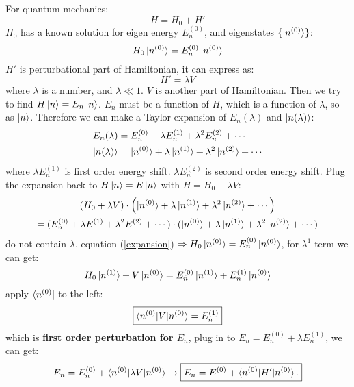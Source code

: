 \documentclass[UTF8,12pt]{article} %
\begin{document}
For quantum mechanics:
\begin{equation}
    H=H_{0} + H'
\end{equation}
$H_0$ has a known solution for eigen energy $E^{(0)}_{n}$, and eigenstates $\{\ket{n^{(0)}}\}$:
\begin{equation}
    H_0\ket{n^{(0)}}=E^{(0)}_n\ket{n^{(0)}}
\end{equation}
$H'$ is perturbational part of Hamiltonian, it can express as:
\begin{equation}
    H'=\lambda V
\end{equation}
where $\lambda$ is a number, and $\lambda\ll1$. $V$ is another part of Hamiltonian. Then we try to find $H\ket{n} = E_{n}\ket{n}$. $E_{n}$ must be a function of $H$, which is a function of $\lambda$, so as $\ket{n}$. Therefore we can make a Taylor expansion of $E_{n}(\lambda)$ and $\ket{n(\lambda)}$:
\begin{align}
E_n(\lambda) &= E_n^{(0)}+\lambda E^{(1)}_n+\lambda^2 E^{(2)}_n+\cdots \\ 
\ket{n(\lambda)} &= \ket{n^{(0)}}+\lambda \ket{n^{(1)}}+\lambda^2 \ket{n^{(2)}}+\cdots
\end{align}
where $\lambda E^{(1)}_{n}$ is first order energy shift. $\lambda E^{(2)}_n$ is second order energy shift. Plug the expansion back to $H\ket{n}=E\ket{n}$ with $H=H_0+\lambda V$:
\begin{multline}
(H_0+\lambda V) \cdot \left(\ket{n^{(0)}}+\lambda \ket{n^{(1)}}+\lambda^2\ket{n^{(2)}}+\cdots\right) \\
= (E^{(0)}_n+\lambda E^{(1)}+\lambda^2E^{(2)}+\cdots)\cdot (\ket{n^{(0)}}+\lambda \ket{n^{(1)}}+\lambda^2\ket{n^{(2)}}+\cdots)
\label{expansion}
\end{multline}
do not contain $\lambda$, equation (\ref{expansion}) $\Rightarrow H_0\ket{n^{(0)}}=E^{(0)}_n\ket{n^{(0)}}$, for $\lambda^{1}$ term we can get:
\begin{equation}
H_{0} \ket{n^{(1)}}+V\ket{n^{(0)}}=E^{(0)}_n\ket{n^{(1)}}+E^{(1)}_n\ket{n^{(0)}}
\label{order1}
\end{equation}
apply $\bra{n^{(0)}}$ to the left:
\begin{equation}
\boxed{ \braket{n^{(0)}|V|n^{(0)}} = E^{(1)}_{n}}  
\label{e1}
\end{equation}
which is \textbf{first order perturbation for $E_{n}$}, plug in to $E_{n} = E^{(0)}_{n} + \lambda E^{(1)}_{n}$, we can get:
\begin{equation}
    \begin{aligned}
        E_n= E^{(0)}_n+ \braket{n^{(0)}|\lambda V|n^{(0)}} \to \boxed {E_n=E^{(0)}+\braket{n^{(0)}|H'|n^{(0)}} . }
    \end{aligned}    
\end{equation}
\end{document}
